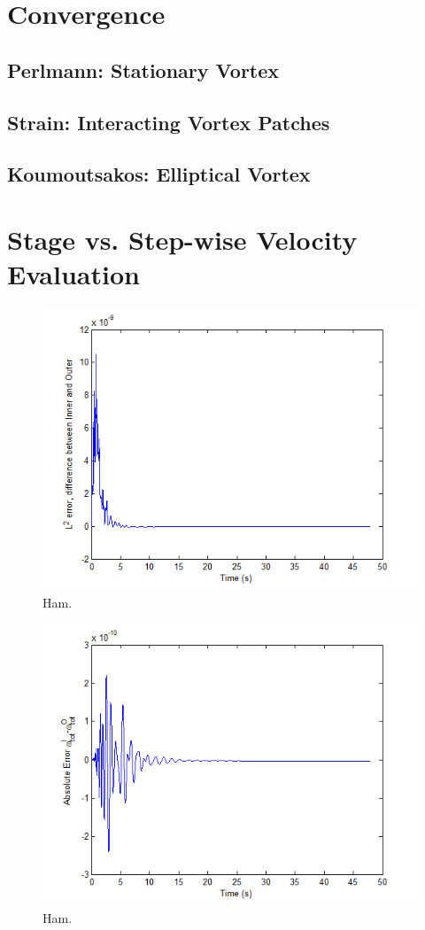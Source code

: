 \documentclass[letterpaper,12pt]{report}
\begin{document}
\section{Convergence}
\subsection{Perlmann: Stationary Vortex}

\subsection{Strain: Interacting Vortex Patches}

\subsection{Koumoutsakos: Elliptical Vortex}


\section{Stage vs. Step-wise Velocity Evaluation}
\begin{figure}
\centering
\includegraphics[width=5in]{dL2_NM5_K6.PNG}
\caption{\label{fig:dL2SS}Ham.}
\end{figure}

\begin{figure}
\centering
\includegraphics[width=5in]{dwtot_NM5_K6.PNG}
\caption{\label{fig:dwtotSS}Ham.}
\end{figure}
\end{document}
